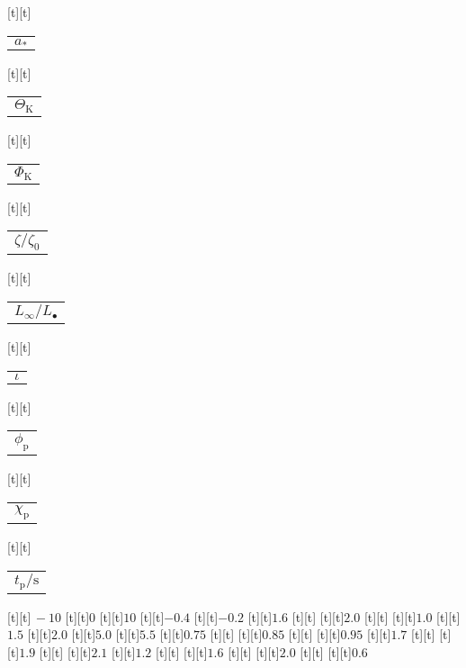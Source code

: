 \begin{psfrags}
[t][t]{\color[rgb]{0,0,0}\setlength{\tabcolsep}{0pt}\begin{tabular}{c}{$a_\ast$}\end{tabular}}%
[t][t]{\color[rgb]{0,0,0}\setlength{\tabcolsep}{0pt}\begin{tabular}{c}{$\Theta_\mathrm{K}$}\end{tabular}}%
[t][t]{\color[rgb]{0,0,0}\setlength{\tabcolsep}{0pt}\begin{tabular}{c}{$\Phi_\mathrm{K}$}\end{tabular}}%
[t][t]{\color[rgb]{0,0,0}\setlength{\tabcolsep}{0pt}\begin{tabular}{c}{$\zeta/\zeta_0$}\end{tabular}}%
[t][t]{\color[rgb]{0,0,0}\setlength{\tabcolsep}{0pt}\begin{tabular}{c}{$L_\infty/L_\bullet$}\end{tabular}}%
[t][t]{\color[rgb]{0,0,0}\setlength{\tabcolsep}{0pt}\begin{tabular}{c}{$\iota$}\end{tabular}}%
[t][t]{\color[rgb]{0,0,0}\setlength{\tabcolsep}{0pt}\begin{tabular}{c}{$\phi_\mathrm{p}$}\end{tabular}}%
[t][t]{\color[rgb]{0,0,0}\setlength{\tabcolsep}{0pt}\begin{tabular}{c}{$\chi_\mathrm{p}$}\end{tabular}}%
[t][t]{\color[rgb]{0,0,0}\setlength{\tabcolsep}{0pt}\begin{tabular}{c}{$t_\mathrm{p}/\mathrm{s}$}\end{tabular}}%
%
[t][t]{$\,-10$}%
[t][t]{$0$}%
[t][t]{$10$}%
[t][t]{$-0.4$}%
[t][t]{$-0.2$}%
[t][t]{$1.6$}%
[t][t]{}%
[t][t]{$2.0$}%
[t][t]{}%
[t][t]{$1.0$}%
[t][t]{$1.5$}%
[t][t]{$2.0$}%
[t][t]{$5.0$}%
[t][t]{$5.5$}%
[t][t]{$0.75$}%
[t][t]{}%
[t][t]{$0.85$}%
[t][t]{}%
[t][t]{$0.95$}%
[t][t]{$1.7$}%
[t][t]{}%
[t][t]{$1.9$}%
[t][t]{}%
[t][t]{$2.1$}%
[t][t]{$1.2$}%
[t][t]{}%
[t][t]{$1.6$}%
[t][t]{}%
[t][t]{$2.0$}%
[t][t]{}%
[t][t]{$0.6$}%

\end{psfrags}
